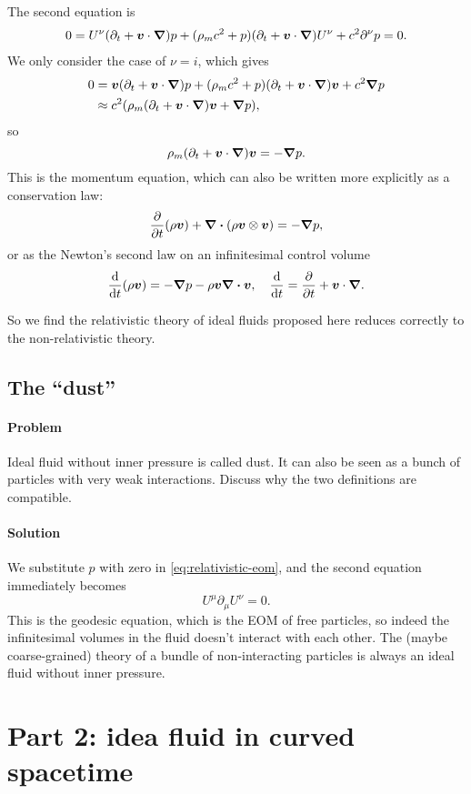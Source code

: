 \documentclass[hyperref, a4paper]{article}
\begin{document}
The second equation is 
\[
    \begin{aligned}
        0 = U^\nu (\partial_t + \vb*{v} \cdot \grad) p + (\rho_m c^2 + p) (\partial_t + \vb*{v} \cdot \grad) U^\nu + c^2 \partial^\nu p = 0.
    \end{aligned}
\]
We only consider the case of $\nu = i$, which gives 
\[
    \begin{aligned}
        0 &= \vb*{v} (\partial_t + \vb*{v} \cdot \grad) p + (\rho_m c^2 + p) (\partial_t + \vb*{v} \cdot \grad) \vb*{v} + c^2 \grad{p} \\ 
        &\approx c^2 ( \rho_m (\partial_t + \vb*{v} \cdot \grad) \vb*{v} + \grad{p} ), 
    \end{aligned}
\]
so 
\begin{equation}
    \rho_m (\partial_t + \vb*{v} \cdot \grad) \vb*{v} = - \grad{p}.
\end{equation}
This is the momentum equation, which can also be written more explicitly as a conservation law:
\begin{equation}
    \pdv{t} (\rho \vb*{v}) + \div{(\rho \vb*{v} \otimes \vb*{v})} = - \grad{p},
\end{equation} 
or as the Newton's second law on an infinitesimal control volume
\begin{equation}
    \dv{t} (\rho \vb*{v})  = -\grad{p} - \rho \vb*{v} \div{\vb*{v}} , \quad \dv{t} = \pdv{t} + \vb*{v} \cdot \grad.
\end{equation}

So we find the relativistic theory of ideal fluids proposed here reduces correctly to the non-relativistic theory.

\subsection{The ``dust''}

\paragraph{Problem} Ideal fluid without inner pressure is called dust. It can also be seen as a bunch of 
particles with very weak interactions. Discuss why the two definitions are compatible.

\paragraph{Solution} We substitute $p$ with zero in \eqref{eq:relativistic-eom}, and the second equation 
immediately becomes 
\begin{equation}
    U^\mu \partial_\mu U^\nu = 0.
\end{equation}
This is the geodesic equation, which is the EOM of free particles, so indeed the infinitesimal volumes in 
the fluid doesn't interact with each other. The (maybe coarse-grained) theory of a bundle of non-interacting 
particles is always an ideal fluid without inner pressure. 

\section{Part 2: idea fluid in curved spacetime}
\end{document}
